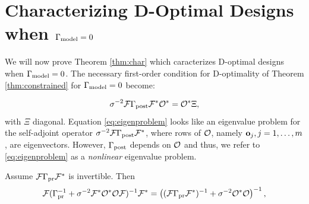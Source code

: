 \section{Characterizing D-Optimal Designs when $\Gamma_{\textup{model}} = 0$}\label{section:vanishing}
We will now prove Theorem \ref{thm:char} which caracterizes D-optimal
designs when $\Gamma_{\textup{model}} = 0$. The necessary first-order condition for
D-optimality of Theorem \ref{thm:constrained} for $\Gamma_{\textup{model}} = 0$
become:

\begin{equation}\label{eq:eigenproblem}
  \sigma^{-2}\fwd \postcov \fwd^* \obs^* = \obs^* \Xi,
\end{equation}
with $\Xi$ diagonal. Equation \eqref{eq:eigenproblem} looks like an
eigenvalue problem for the self-adjoint operator $\sigma^{-2}\mathcal{F}
\Gamma_{\textup{post}} \mathcal{F}^*$, where rows of $\mathcal{O}$, namely $\mathbf{o}_j,j=1,\dots, m$,
are eigenvectors. However, $\Gamma_{\textup{post}}$ depends on $\mathcal{O}$ and thus, we
refer to \eqref{eq:eigenproblem} as a \emph{nonlinear} eigenvalue
problem.%

\begin{proposition}\label{prop:twice woodbury}
  Assume $\mathcal{F} \Gamma_{\textup{pr}} \mathcal{F}^*$ is invertible. Then
  \begin{align*}
    \begin{split}
      \fwd( \prcov^{-1} + \sigma^{-2}  \fwd^* \obs^* \obs \fwd )^{-1} \fwd^* 
      = \left ( (\fwd\prcov\fwd^*)^{-1} + \sigma^{-2}  \obs^* \obs \right )^{-1},
    \end{split}
  \end{align*}  
\end{proposition}

